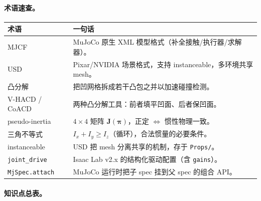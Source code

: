 \paragraph{术语速查。}

\begin{center}
\small
\begin{tabular}{@{}ll@{}}
\toprule
术语 & 一句话 \\
\midrule
MJCF & MuJoCo 原生 XML 模型格式（补全接触/执行器/求解器）。 \\
USD & Pixar/NVIDIA 场景格式，支持 instanceable，多环境共享 mesh。 \\
凸分解 & 把凹网格拆成若干凸包之并以加速碰撞检测。 \\
V-HACD / CoACD & 两种凸分解工具：前者填平凹面、后者保凹面。 \\
pseudo-inertia & $4\times4$ 矩阵 $\mathbf{J}(\boldsymbol\pi)$，正定 $\iff$ 惯性物理一致。 \\
三角不等式 & $I_x+I_y\ge I_z$（循环），合法惯量的必要条件。 \\
instanceable & USD 把 mesh 分离共享的机制，存于 \texttt{Props/}。 \\
\texttt{joint\_drive} & Isaac Lab v2.x 的结构化驱动配置（含 \texttt{gains}）。 \\
\texttt{MjSpec.attach} & MuJoCo 运行时把子 spec 挂到父 spec 的组合 API。 \\
\bottomrule
\end{tabular}
\end{center}

\paragraph{知识点总表。}

